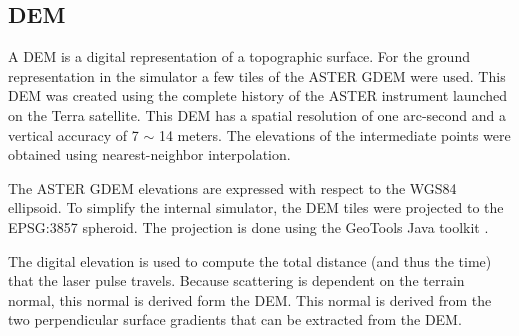 \subsection{\acl{DEM}}
\label{DEM}

A \acl{DEM} is a digital representation of a topographic surface. For the ground representation
in the simulator a few tiles of the \ac{ASTER} \ac{GDEM} were used. This \ac{DEM} was created using the
complete history of the \ac{ASTER} instrument launched on the Terra satellite. This \ac{DEM} has a
spatial resolution of one arc-second and a vertical accuracy of 7 $\sim$ 14 meters. The elevations of the
intermediate points were obtained using nearest-neighbor interpolation.

The \ac{ASTER} \ac{GDEM} elevations are expressed with respect to the \ac{WGS84} ellipsoid. To simplify the
internal simulator, the \ac{DEM} tiles were projected to the EPSG:3857 spheroid. The projection
is done using the GeoTools Java toolkit \cite{geotools}.

The digital elevation is used to compute the total distance (and thus the time) that the laser pulse
travels. Because scattering is dependent on the terrain normal, this normal is
derived form the \ac{DEM}. This normal is derived from the two perpendicular surface gradients that
can be extracted from the \ac{DEM}.